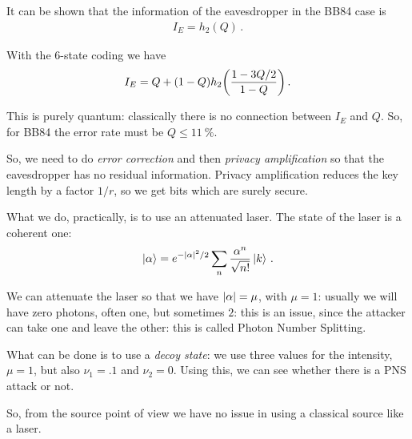 \documentclass[main.tex]{subfiles}
\begin{document}
It can be shown that the information of the eavesdropper in the BB84 case is 
%
\begin{align}
I_E = h_2 (Q)
\,.
\end{align}

With the 6-state coding we have 
%
\begin{align}
I_E = Q + (1- Q) h_2 \qty(\frac{1 - 3 Q / 2}{1 - Q})
\,.
\end{align}

This is purely quantum: classically there is no connection between \(I_E\) and \(Q\). 
So, for BB84 the error rate must be \(Q \leq \SI{11}{\percent}\).

So, we need to do \emph{error correction} and then \emph{privacy amplification} so that the eavesdropper has no residual information. 
Privacy amplification reduces the key length by a factor \(1/r\), so we get bits which are surely secure. 

What we do, practically, is to use an attenuated laser. The state of the laser is a coherent one: 
%
\begin{align}
\ket{\alpha } = e^{- \abs{\alpha }^2 / 2} \sum _{n} \frac{\alpha ^{n}}{\sqrt{n!}} \ket{k}
\,.
\end{align}

We can attenuate the laser so that we have \(\abs{\alpha } = \mu \), with \(\mu = 1\): usually we will have zero photons, often one, but sometimes \(2\): this is an issue, since the attacker can take one and leave the other: this is called Photon Number Splitting. 

What can be done is to use a \emph{decoy state}: we use three values for the intensity, \(\mu = 1 \), but  also  \( \nu_1 = .1 \) and \(\nu_2 =  0\). Using this, we can see whether there is a PNS attack or not. 

So, from the source point of view we have no issue in using a classical source like a laser. 
\end{document}

